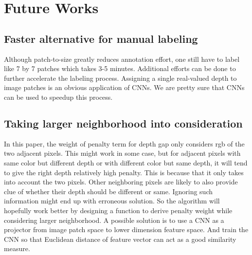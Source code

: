 \documentclass[10pt,twocolumn,letterpaper]{article}
\begin{document}
\section{Future Works}
\subsection{Faster alternative for manual labeling}
Although patch-to-size greatly reduces annotation effort, one still have to label like 7 by 7 patches which takes 3-5 minutes. Additional efforts can be done to further accelerate the labeling process. Assigning a single real-valued depth to image patches is an obvious application of CNNs. We are pretty sure that CNNs can be used to speedup this process. 
\subsection{Taking larger neighborhood into consideration}
In this paper, the weight of penalty term for depth gap only considers rgb of the two adjacent pixels. This might work in some case, but for adjacent pixels with same color but different depth or with different color but same depth, it will tend to give the right depth relatively high penalty. This is because that it only takes into account the two pixels. Other neighboring pixels are likely to also provide clue of whether their depth should be different or same. Ignoring such information might end up with erroneous solution. So the algorithm will hopefully work better by designing a function to derive penalty weight while considering larger neighborhood. A possible solution is to use a CNN as a projector from image patch space to lower dimension feature space. And train the CNN so that Euclidean distance of feature vector can act as a good similarity measure.


{\small


}
\end{document}
